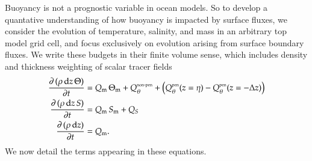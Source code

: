 Buoyancy is not a prognostic variable in ocean models.  So to develop
a quantative understanding of how buoyancy is impacted by surface
fluxes, we consider the evolution of temperature, salinity, and mass
in an arbitrary top model grid cell, and focus exclusively on
evolution arising from surface boundary fluxes.  We write these
budgets in their finite volume sense, which includes density and
thickness weighting of scalar tracer fields 
\begin{align}
 \frac{\partial \, (\rho \, \mathrm{d}z \, \Theta)}{\partial t} &=  Q_{\mbox{\scriptsize m}} \, \Theta_{\mbox{\scriptsize m}} 
  + Q_{\theta}^{\mbox{\tiny non-pen}} 
  + \left( Q_{\theta}^{\mbox{\tiny pen}}(z=\eta) - Q_{\theta}^{\mbox{\tiny pen}}(z=-\Delta z) 
     \right)
 \label{eq:surface-temperature-equation-kpp}
\\
 \frac{\partial \, (\rho \, \mathrm{d}z \, S)}{\partial t} &=  Q_{\mbox{\scriptsize m}} \, S_{\mbox{\scriptsize m}} + Q_{S}
 \label{eq:surface-salinity-equation-kpp}
  \\
 \frac{\partial \, (\rho \, \mathrm{d}z)}{\partial t} &=  Q_{\mbox{\scriptsize m}}.
 \label{eq:surface-mass-equation-kpp}
\end{align}
 We now detail the terms appearing in these equations.  
